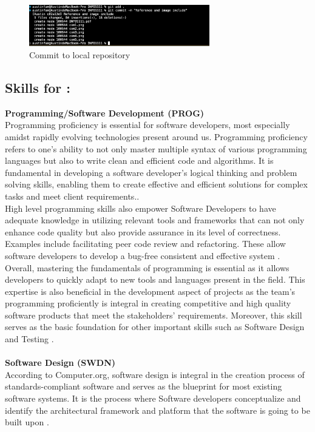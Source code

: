 \documentclass[a4paper, 11pt]{report}
\begin{document}
\begin{figure}[H]
    \centering
    \includegraphics[width=0.7\textwidth]{git1}
    \caption{Commit to local repository}
\end{figure}
\newpage
\subsection{Skills for \majC: \studC}
\textbf{Programming/Software Development (PROG)}
\\[1em]
Programming proficiency is essential for software developers, most especially amidst rapidly evolving technologies present around us. Programming proficiency refers to one's ability to not only master multiple syntax of various programming languages but also to write clean and efficient code and algorithms. It is fundamental in developing a software developer's logical thinking and problem solving skills, enabling them to create effective and efficient solutions for complex tasks and meet client requirements.\cite{PROG3}\cite{PROG4}.
\\[1em]
High level programming skills also empower Software Developers to have adequate knowledge in utilizing relevant tools and frameworks that can not only enhance code quality but also provide assurance in its level of correctness. Examples include facilitating peer code review and refactoring. These allow software developers to develop a bug-free consistent and effective system \cite{PROG1}\cite{PROG3}. 
\\[1em]
Overall, mastering the fundamentals of programming is essential as it allows developers to quickly adapt to new tools and languages present in the field. This expertise is also beneficial in the development aspect of projects as the team's programming proficiently is integral in creating competitive and high quality software products that meet the stakeholders’ requirements. Moreover, this skill serves as the basic foundation for other important skills such as Software Design and Testing \cite{PROG1}\cite{PROG3}.
\\[1em]
\\[1em]
\noindent \textbf {Software Design (SWDN)} 
\\[1em]
According to Computer.org, software design is integral in the creation process of  standards-compliant software and serves as the blueprint for most existing software systems.  It is the process where Software developers conceptualize and identify the architectural framework and platform that the software is going to be built upon \cite{SWDN1}.
\end{document}
